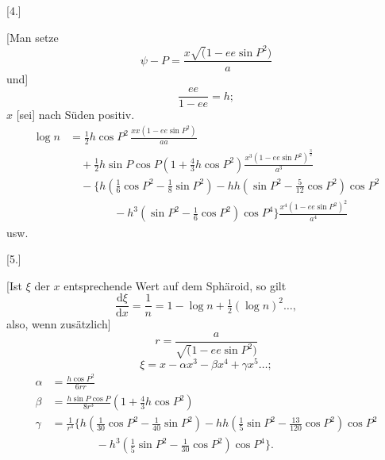 \par\clearpage
\noindent\makebox[12mm][l]{}\par\medskip

\begin{center}[4.]\end{center}
[Man setze
\[
\psi-P=\frac{x\surd(1-ee\sin P^2)}a
\]
\noindent und]
\[
\frac{ee}{1-ee}=h;
\]
\noindent \(x\) [sei] nach Süden positiv.
\[
\begin{aligned}
\log n&=\tfrac12h\cos P^2\,\frac{xx(1-ee\sin P^2)}{aa}\\
&\quad+\tfrac12h\sin P\cos P(1+\tfrac43h\cos P^2)
\frac{x^3(1-ee\sin P^2)^{\frac32}}{a^3}\\
&\quad-\{h(\tfrac16\cos P^2-\tfrac18\sin P^2)
-hh(\sin P^2-\tfrac5{12}\cos P^2)\cos P^2\\
&\qquad\qquad-h^3(\sin P^2-\tfrac16\cos P^2)\cos P^4\}
\frac{x^4(1-ee\sin P^2)^2}{a^4}
\end{aligned}
\]
\noindent\hfill usw.\hfill\null\par

\bigskip
\begin{center}[5.]\end{center}
[Ist \(\xi\) der \(x\) entsprechende Wert auf dem Sphäroid, so gilt
\[
\frac{\mathrm d\xi}{\mathrm dx}=\frac1n=1-\log n+\tfrac12(\log n)^2\ldots,
\]
\noindent also, wenn zusätzlich]
\[
r=\frac a{\surd(1-ee\sin P^2)}
\]
\[
\xi=x-\alpha x^3-\beta x^4+\gamma x^5\ldots;
\]
\[
\begin{aligned}
\alpha&=\frac{h\cos P^2}{6rr}\\
\beta&=\frac{h\sin P\cos P}{8r^3}(1+\tfrac43h\cos P^2)\\
\gamma&=\frac1{r^4}\{h(\tfrac1{30}\cos P^2-\tfrac1{40}\sin P^2)
-hh(\tfrac15\sin P^2-\tfrac{13}{120}\cos P^2)\cos P^2\\
&\qquad\qquad-h^3(\tfrac15\sin P^2-\tfrac1{30}\cos P^2)\cos P^4\}.
\end{aligned}
\]
\par
\endgroup
